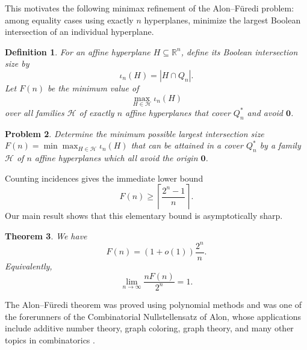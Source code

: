 \documentclass[11pt]{article}
\newtheorem{theorem}{Theorem}[section]
\newtheorem{definition}[theorem]{Definition}
\newtheorem{problem}[theorem]{\bf Problem}
\newcommand{\Q}{Q}
\newcommand{\isect}{\iota}
\newcommand{\1}{\mathbf{1}}
\newcommand{\R}{\mathbb{R}}
\newcommand\cH{{\mathcal H}}
\begin{document}
	This motivates the following minimax refinement of the Alon–Füredi problem: among equality cases using exactly $n$ hyperplanes, minimize the largest Boolean intersection of an individual hyperplane.
	
	\begin{definition}\label{def:F}
		For an affine hyperplane $H\subseteq\R^n$, define its \emph{Boolean intersection size} by
		\[
		\isect_n(H)=|H\cap\Q_n|.
		\]
		Let $F(n)$ be the minimum value of
		\[
		\max_{H\in\mathcal H}\isect_n(H)
		\]
		over all families $\mathcal H$ of exactly $n$ affine hyperplanes that cover $\Q_n^*$ and avoid $\textbf{0}$.
	\end{definition}
	
	\begin{problem}
		Determine the minimum possible largest intersection size  $F(n)=
		\min \max_{H\in\mathcal H}\isect_n(H)$ that can be attained in a cover $\Q_n^*$ by  a family  $\cH$ of $n$ affine hyperplanes which all  avoid the origin $\textbf{0}$.
	\end{problem}
	
	Counting incidences gives the immediate lower bound
	\begin{equation}\label{eq:averaging-lb}
		F(n)\ge \left\lceil\frac{2^n-1}{n}\right\rceil.
	\end{equation}
	Our main result shows that this elementary bound is asymptotically sharp.
	
	\begin{theorem}\label{thm:main}
		We have
		\[
		F(n)=(1+o(1))\frac{2^n}{n}.
		\]
		Equivalently,
		\[
		\lim_{n\to\infty}\frac{nF(n)}{2^n}=1.
		\]
	\end{theorem}
	
	The Alon--F\"uredi theorem was proved using polynomial methods and was one of the forerunners  of the  Combinatorial Nullstellensatz of Alon, whose applications include additive number theory, graph coloring, graph theory, and many other topics in  combinatorics \cite{Alon1999}.
	
\end{document}
